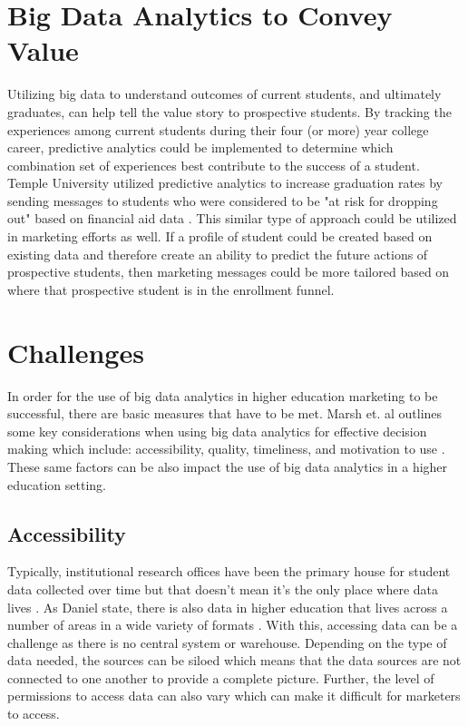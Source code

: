 \documentclass[sigconf]{acmart}
\begin{document}
\section{Big Data Analytics to Convey Value}
Utilizing big data to understand outcomes of current students, and ultimately graduates, can help tell the value story to prospective students. By tracking the experiences among current students during their four (or more) year college career, predictive analytics could be implemented to determine which combination set of experiences best contribute to the success of a student. Temple University utilized predictive analytics to increase graduation rates by sending messages to students who were considered to be "at risk for dropping out" based on financial aid data \cite{Zinshteyn2016}. This similar type of approach could be utilized in marketing efforts as well. If a profile of student could be created based on existing data and therefore create an ability to predict the future actions of prospective students, then marketing messages could be more tailored based on where that prospective student is in the enrollment funnel. 

\section{Challenges}
In order for the use of big data analytics in higher education marketing to be successful, there are basic measures that have to be met. Marsh et. al outlines some key considerations when using big data analytics for effective decision making which include: accessibility, quality, timeliness, and motivation to use \cite{Marsh2006}. These same factors can be also impact the use of big data analytics in a higher education setting. 

\subsection{Accessibility}
Typically, institutional research offices have been the primary house for student data collected over time but that doesn't mean it's the only place where data lives \cite{Picciano2012}. As Daniel state, there is also data in higher education that lives across a number of areas in a wide variety of formats \cite{Daniel2015}. With this, accessing data can be a challenge as there is no central system or warehouse. Depending on the type of data needed, the sources can be siloed which means that the data sources are not connected to one another to provide a complete picture. Further, the level of permissions to access data can also vary which can make it difficult for marketers to access. 
\end{document}
